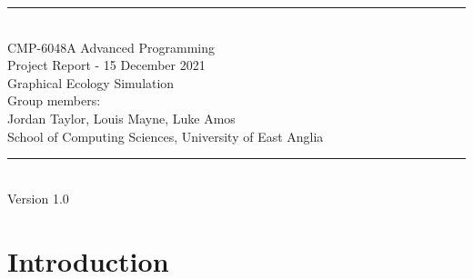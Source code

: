\documentclass[a4paper, oneside, 11pt]{report}
\begin{document}
\begin{titlepage}
\begin{center}
\rule{12cm}{1mm} \\
\vspace{1cm}
{\large  CMP-6048A Advanced Programming}
\vspace{7.5cm}
\\{\Large Project Report - 15 December 2021}
\vspace{1.5cm}
\\{\LARGE Graphical Ecology Simulation}
\vspace{1.0cm}
\\{\Large Group members: \\ Jordan Taylor, Louis Mayne, Luke Amos}
\vspace{10.0cm}
\\{\large School of Computing Sciences, University of East Anglia}
\\ \rule{12cm}{0.5mm}
\\ \hspace{8.5cm} {\large Version 1.0}
\end{center}
\end{titlepage}


\setcounter{page}{1}


\begin{abstract}
In our Graphical Ecology Simulation we planned to implement a finite state machine design pattern to be used on each agent. This state machine would hold the current state and execute that state's behaviour. The states we planned to implement were "Idle", "Feed", "Hunt", "Flee", and "Reproduce". A basic implementation of these states would make up our Minimum Viable Product. We also planned to add a genetics system, to modify the attributes of the state machine to make different agents better or worse at completing their goals. We completed the basic implementations of the listed states but did not get any further. The final product is an ecology simulation where agents make random decisions to try to achieve their goals, we found that because the agents were not making "smart" decisions their fate as a group (the prey or predators) was determined by their ability to detect their targets. 
\end{abstract}

\chapter{Introduction}
\label{chap:intro}
\end{document}
